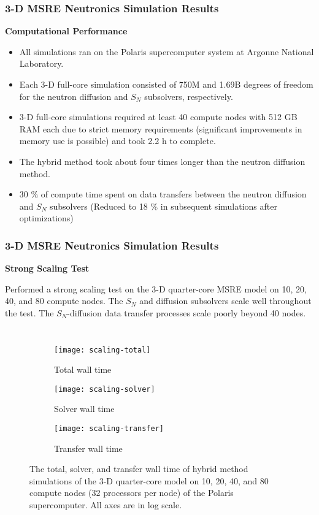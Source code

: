 \begin{frame}
  \frametitle{3-D MSRE Neutronics Simulation Results}
  \textbf{Computational Performance}
  \begin{itemize}
    \item All simulations ran on the Polaris supercomputer system at Argonne National Laboratory.
    \item Each 3-D full-core simulation consisted of 750M and 1.69B degrees of freedom for the
      neutron diffusion and $S_N$ subsolvers, respectively.
    \item 3-D full-core simulations required at least 40 compute nodes with 512 GB RAM each due to
      strict memory requirements (significant improvements in memory use is possible) and took 2.2
      h to complete.
    \item The hybrid method took about four times longer than the neutron diffusion method.
    \item 30 \% of compute time spent on data transfers between the neutron diffusion and $S_N$
      subsolvers (Reduced to 18 \% in subsequent simulations after optimizations)
  \end{itemize}
\end{frame}

\begin{frame}
  \frametitle{3-D MSRE Neutronics Simulation Results}
  \textbf{Strong Scaling Test}
  \vspace{.2cm}

  Performed a strong scaling test on the 3-D quarter-core MSRE model on 10, 20, 40, and 80 compute
  nodes. The $S_N$ and diffusion subsolvers scale well throughout the test.
  The $S_N$-diffusion data transfer processes scale poorly beyond 40 nodes.
  \begin{columns}
  \column{11cm}
  \begin{figure}[t]
    \centering
    \begin{subfigure}[b]{0.32\columnwidth}
      \centering
      \texttt{[image: scaling-total]}
      \caption{Total wall time}
    \end{subfigure}
    \begin{subfigure}[b]{0.32\columnwidth}
      \centering
      \texttt{[image: scaling-solver]}
      \caption{Solver wall time}
    \end{subfigure}
    \begin{subfigure}[b]{0.32\columnwidth}
      \centering
      \texttt{[image: scaling-transfer]}
      \caption{Transfer wall time}
    \end{subfigure}
    \caption{The total, solver, and transfer wall time of hybrid method simulations of the 3-D
    quarter-core model on 10, 20, 40, and 80 compute nodes (32 processors per node) of the Polaris
    supercomputer. All axes are in log scale.}
    \label{fig:scaling}
  \end{figure}
\end{columns}
\end{frame}
